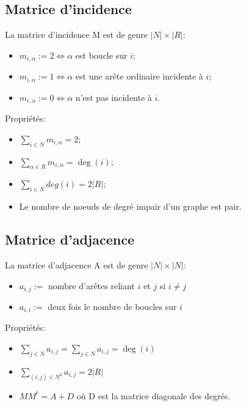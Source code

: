 \subsection{Matrice d'incidence}
La matrice d'incidence M est de genre $|N|\times |R|$:
\begin{itemize}
  \item $m_{i,\alpha} := 2 \Leftrightarrow \alpha$ est boucle sur $i$;
  \item $m_{i,\alpha} := 1 \Leftrightarrow \alpha$
    est une arête ordinaire incidente à $i$;
  \item $m_{i,\alpha} := 0 \Leftrightarrow \alpha$ n'est pas incidente à $i$.
\end{itemize}
Propriétés:
\begin{itemize}
  \item $\sum_{i \in N}m_{i,\alpha} = 2$;
  \item $\sum_{\alpha \in R}m_{i,\alpha} = \deg(i)$;
  \item $\sum_{i \in N}deg(i) = 2|R|$;
  \item Le nombre de noeuds de degré impair d'un graphe est pair.
\end{itemize}
\subsection{Matrice d'adjacence}
La matrice d'adjacence A est de genre $|N| \times |N|$:
\begin{itemize}
  \item $a_{i,j} :=$ nombre d'arêtes reliant $i$ et $j$ si $i \neq j$\\
  \item $a_{i,i} :=$ deux fois le nombre de boucles sur $i$\\
\end{itemize}
Propriétés:
\begin{itemize}
  \item $\sum_{j \in N}a_{i,j} = \sum_{j \in N}a_{i,j} = \deg(i)$\\
  \item $\sum_{(i,j) \in N^2}a_{i,j} = 2|R|$\\
  \item $MM^t = A + D$ où D est la matrice diagonale des degrés.\\
\end{itemize}

